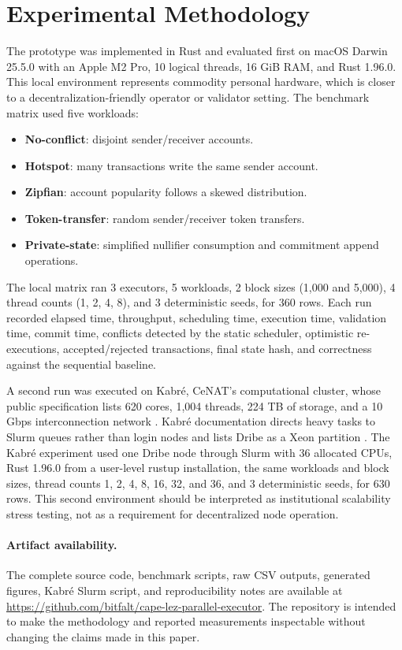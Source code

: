 \documentclass[runningheads]{llncs}
\begin{document}
\section{Experimental Methodology}

The prototype was implemented in Rust and evaluated first on macOS Darwin 25.5.0 with an Apple M2 Pro, 10 logical threads, 16 GiB RAM, and Rust 1.96.0. This local environment represents commodity personal hardware, which is closer to a decentralization-friendly operator or validator setting. The benchmark matrix used five workloads:

\begin{itemize}
\item \textbf{No-conflict}: disjoint sender/receiver accounts.
\item \textbf{Hotspot}: many transactions write the same sender account.
\item \textbf{Zipfian}: account popularity follows a skewed distribution.
\item \textbf{Token-transfer}: random sender/receiver token transfers.
\item \textbf{Private-state}: simplified nullifier consumption and commitment append operations.
\end{itemize}

The local matrix ran 3 executors, 5 workloads, 2 block sizes (1,000 and 5,000), 4 thread counts (1, 2, 4, 8), and 3 deterministic seeds, for 360 rows. Each run recorded elapsed time, throughput, scheduling time, execution time, validation time, commit time, conflicts detected by the static scheduler, optimistic re-executions, accepted/rejected transactions, final state hash, and correctness against the sequential baseline.

A second run was executed on Kabré, CeNAT's computational cluster, whose public specification lists 620 cores, 1,004 threads, 224 TB of storage, and a 10 Gbps interconnection network \cite{kabre_cenat_cluster}. Kabré documentation directs heavy tasks to Slurm queues rather than login nodes and lists Dribe as a Xeon partition \cite{kabre_slurm_docs}. The Kabré experiment used one Dribe node through Slurm with 36 allocated CPUs, Rust 1.96.0 from a user-level rustup installation, the same workloads and block sizes, thread counts 1, 2, 4, 8, 16, 32, and 36, and 3 deterministic seeds, for 630 rows. This second environment should be interpreted as institutional scalability stress testing, not as a requirement for decentralized node operation.

\paragraph{Artifact availability.}
The complete source code, benchmark scripts, raw CSV outputs, generated figures, Kabré Slurm script, and reproducibility notes are available at \url{https://github.com/bitfalt/cape-lez-parallel-executor}. The repository is intended to make the methodology and reported measurements inspectable without changing the claims made in this paper.
\end{document}
